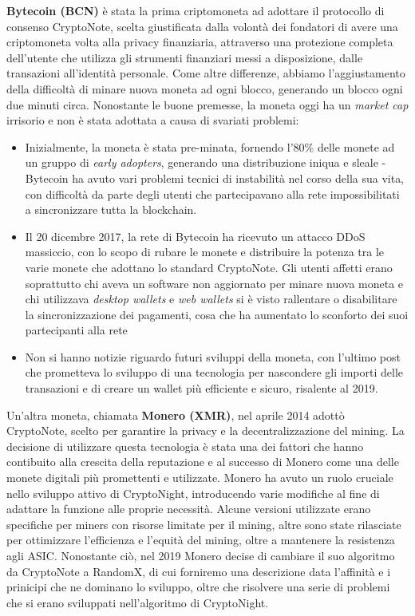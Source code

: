 \textbf{Bytecoin (BCN)} è stata la prima criptomoneta ad adottare il
protocollo di consenso CryptoNote, scelta giustificata dalla volontà dei
fondatori di avere una criptomoneta volta alla privacy finanziaria,
attraverso una protezione completa dell'utente che utilizza gli
strumenti finanziari messi a disposizione, dalle transazioni
all'identità personale. Come altre differenze, abbiamo l'aggiustamento
della difficoltà di minare nuova moneta ad ogni blocco, generando un
blocco ogni due minuti circa. Nonostante le buone premesse, la moneta
oggi ha un \emph{market cap} irrisorio e non è stata adottata a causa di
svariati problemi:
\begin{itemize}
  \item Inizialmente, la moneta è stata pre-minata,
  fornendo l'80\% delle monete ad un gruppo di \emph{early adopters},
  generando una distribuzione iniqua e sleale - Bytecoin ha avuto vari
  problemi tecnici di instabilità nel corso della sua vita, con difficoltà
  da parte degli utenti che partecipavano alla rete impossibilitati a
  sincronizzare tutta la blockchain.
  \item Il 20 dicembre 2017, la rete di
  Bytecoin ha ricevuto un attacco DDoS massiccio, con lo scopo di rubare
  le monete e distribuire la potenza tra le varie monete che adottano lo
  standard CryptoNote. Gli utenti affetti erano soprattutto chi aveva un
  software non aggiornato per minare nuova moneta e chi utilizzava
  \emph{desktop wallets} e \emph{web wallets} si è visto rallentare o
  disabilitare la sincronizzazione dei pagamenti, cosa che ha aumentato lo
  sconforto dei suoi partecipanti alla rete
  \item  Non si hanno notizie
  riguardo futuri sviluppi della moneta, con l'ultimo post che prometteva
  lo sviluppo di una tecnologia per nascondere gli importi delle
  transazioni e di creare un wallet più efficiente e sicuro, risalente al
  2019.
\end{itemize}

Un'altra moneta, chiamata \textbf{Monero (XMR)}, nel aprile 2014 adottò
CryptoNote, scelto per garantire la privacy e la decentralizzazione del
mining. La decisione di utilizzare questa tecnologia è stata una dei
fattori che hanno contibuito alla crescita della reputazione e al
successo di Monero come una delle monete digitali più promettenti e
utilizzate. Monero ha avuto un ruolo cruciale nello sviluppo attivo di
CryptoNight, introducendo varie modifiche al fine di adattare la
funzione alle proprie necessità. Alcune versioni utilizzate erano
specifiche per miners con risorse limitate per il mining, altre sono
state rilasciate per ottimizzare l'efficienza e l'equità del mining,
oltre a mantenere la resistenza agli ASIC. Nonostante ciò, nel 2019
Monero decise di cambiare il suo algoritmo da CryptoNote a RandomX, di
cui forniremo una descrizione data l'affinità e i prinicipi che ne
dominano lo sviluppo, oltre che risolvere una serie di problemi che si
erano sviluppati nell'algoritmo di CryptoNight.


